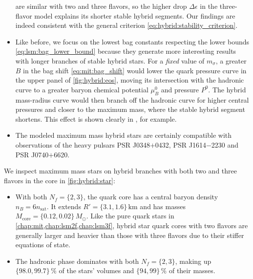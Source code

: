 \begin{itemize}
      are similar with two and three flavors,
      so the higher drop $\Delta \epsilon$ in the three-flavor model explains its shorter stable hybrid segments.
      Our findings are indeed consistent with the general criterion \eqref{eq:hybrid:stability_criterion}.
\item Like before, we focus on the lowest bag constants respecting the lower bounds \eqref{eq:lsm:bag_lower_bound}
      because they generate more interesting results with longer branches of stable hybrid stars.
      For a \emph{fixed} value of $m_\sigma$,
      a greater $B$ in the bag shift \eqref{eq:mit:bag_shift}
      would lower the quark pressure curve in the upper panel of \cref{fig:hybrid:eos},
      moving its intersection with the hadronic curve to a greater baryon chemical potential $\mu_B^0$ and pressure $P^0$.
      The hybrid mass-radius curve would then branch off the hadronic curve for higher central pressures and closer to the maximum mass,
      where the stable hybrid segment shortens.
      This effect is shown clearly in \cite[figure 14]{ref:lsm3f_hybrid_stars}, for example.
\item The modeled maximum mass hybrid stars 
      are certainly compatible with observations
      of the heavy pulsars PSR J0348$+$0432, PSR J1614$-$2230 and PSR J0740$+$6620.
\end{itemize}

\pagebreak
We inspect maximum mass stars on hybrid branches with both two and three flavors in the core in \cref{fig:hybrid:star}:
\begin{itemize}
\item With both $N_f=\{2,3\}$, the quark core has a central baryon density $n_B = 6 n_\text{sat}$.
      It extends $R' = \{3.1,1.6\} \, \si{\kilo\meter}$ and has masses $M_\text{core} = \{0.12,0.02\} \, M_\odot$.
      Like the pure quark stars in \cref{chap:mit,chap:lsm2f,chap:lsm3f},
      hybrid star quark cores with two flavors are generally larger and heavier than those with three flavors
      due to their stiffer equations of state.
\item The hadronic phase dominates with both $N_f=\{2,3\}$, 
      making up $\{98.0,99.7\} \, \si{\percent}$ of the stars' volumes and $\{94,99\} \, \si{\percent}$ of their masses.
\end{itemize}

